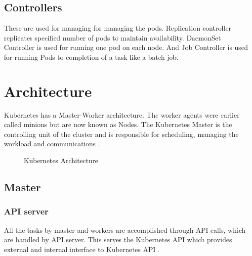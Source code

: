 \documentclass[9pt,twocolumn,twoside]{../../styles/osajnl}
\begin{document}
\subsection{Controllers}
 These are used for managing for managing the pods. Replication controller replicates specified number of pods to maintain availability. DaemonSet Controller is used for running one pod on each node. And Job Controller is used for running Pods to completion of a task like a batch job.

\section{Architecture}

Kubernetes has a Master-Worker architecture. The worker agents were earlier called minions but are now known as Nodes.
The Kubernetes Master is the controlling unit of the cluster and is responsible for scheduling, managing the workload and communications \cite{www-kubernetesebook}.

\begin{figure}[ht!]
\centering
{}
\caption{Kubernetes Architecture \cite{www-kubernetesarchitecture}}
\label{fig:Kubernetes Architecture}
\end{figure}



\subsection{Master}
\subsubsection{API server}
All the tasks by master and workers are accomplished through API calls, which are handled by API server. This serves the Kubernetes API which provides external and internal interface to Kubernetes API \cite{www-kubernetesapi}. 
\end{document}
